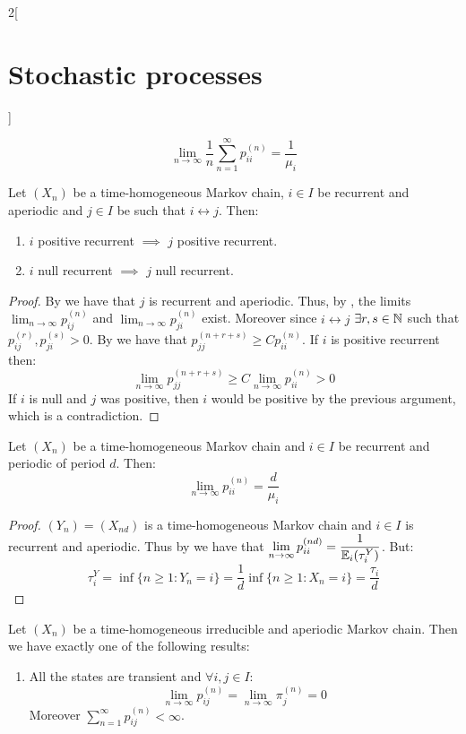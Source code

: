 \documentclass[../../../main_math.tex]{subfiles}
\begin{document}
\begin{multicols}{2}[\section{Stochastic processes}]
\begin{theorem}
    $$
      \lim_{n\to\infty}\frac{1}{n}\sum_{n=1}^\infty p_{ii}^{(n)}=\frac{1}{\mu_i}
    $$
  \end{theorem}
  \begin{proposition}
    Let $(X_n)$ be a time-homogeneous Markov chain, $i\in I$ be recurrent and aperiodic and $j\in I$ be such that $i\leftrightarrow j$. Then:
    \begin{enumerate}
      \item $i$ positive recurrent $\implies$ $j$ positive recurrent.
      \item $i$ null recurrent $\implies$ $j$ null recurrent.
    \end{enumerate}
  \end{proposition}
  \begin{proof}
    By  we have that $j$ is recurrent and aperiodic. Thus, by , the limits $\displaystyle \lim_{n\to\infty}p_{ij}^{(n)}$ and $\displaystyle \lim_{n\to\infty}p_{ji}^{(n)}$ exist. Moreover since $i\leftrightarrow j$ $\exists r,s\in\mathbb{N}$ such that $p_{ij}^{(r)}, p_{ji}^{(s)}>0$. By  we have that $p_{jj}^{(n+r+s)}\geq C p_{ii}^{(n)}$. If $i$ is positive recurrent then:
    $$
      \lim_{n\to\infty}p_{jj}^{(n+r+s)}\geq C\lim_{n\to\infty}p_{ii}^{(n)}>0
    $$
    If $i$ is null and $j$ was positive, then $i$ would be positive by the previous argument, which is a contradiction.
  \end{proof}
  \begin{theorem}
    Let $(X_n)$ be a time-homogeneous Markov chain and $i\in I$ be recurrent and periodic of period $d$. Then:
    $$
      \lim_{n\to\infty} p_{ii}^{(n)}=\frac{d}{\mu_i}
    $$
  \end{theorem}
  \begin{proof}
    $(Y_n)=(X_{nd})$ is a time-homogeneous Markov chain and $i\in I$ is recurrent and aperiodic. Thus by  we have that $\displaystyle\lim_{n\to\infty}p_{ii}^{(nd)}=\frac{1}{\mathbb{E}_i(\tau_i^Y)}$. But:
    $$
      \tau_i^Y=\inf\{ n\geq 1: Y_n=i\}=\frac{1}{d}\inf\{n\geq 1: X_{n}=i\}=\frac{\tau_i}{d}
    $$
  \end{proof}
  \begin{theorem}
    Let $(X_n)$ be a time-homogeneous irreducible and aperiodic Markov chain. Then we have exactly one of the following results:
    \begin{enumerate}
      \item All the states are transient and $\forall i,j\in I$: $$\lim_{n\to\infty} p_{ij}^{(n)}=\lim_{n\to\infty} \pi_j^{(n)}=0$$ Moreover $\sum_{n=1}^\infty p_{ij}^{(n)}<\infty$.

\end{enumerate}
\end{theorem}
\end{multicols}
\end{document}
